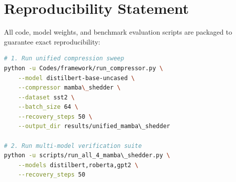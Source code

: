\section{Reproducibility Statement}
All code, model weights, and benchmark evaluation scripts are packaged to guarantee exact reproducibility:
\begin{lstlisting}[language=bash]
# 1. Run unified compression sweep
python -u Codes/framework/run_compressor.py \
    --model distilbert-base-uncased \
    --compressor mamba\_shedder \
    --dataset sst2 \
    --batch_size 64 \
    --recovery_steps 50 \
    --output_dir results/unified_mamba\_shedder

# 2. Run multi-model verification suite
python -u scripts/run_all_4_mamba\_shedder.py \
    --models distilbert,roberta,gpt2 \
    --recovery_steps 50
\end{lstlisting}
